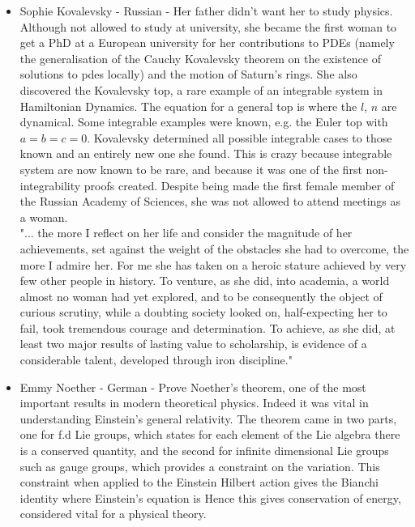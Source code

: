 \documentclass{article}
\begin{document}
\begin{itemize}
    
    \item Sophie Kovalevsky - Russian - Her father didn't want her to study physics. Although not allowed to study at university, she became the first woman to get a PhD at a European university for her contributions to PDEs (namely the generalisation of the Cauchy Kovalevsky theorem on the existence of solutions to pdes locally) and the motion of Saturn's rings. She also discovered the Kovalevsky top, a rare example of an integrable system in Hamiltonian Dynamics. The equation for a general top is 
    where the $l$, $n$ are dynamical. Some integrable examples were known, e.g. the Euler top with $a=b=c=0$. Kovalevsky determined all possible integrable cases to those known and an entirely new one she found. This is crazy because integrable system are now known to be rare, and because it was one of the first non-integrability proofs created. 
    Despite being made the first female member of the Russian Academy of Sciences, she was not allowed to attend meetings as a woman.  \\
    \newline
    "... the more I reflect on her life and consider the magnitude of her achievements, set against the weight of the obstacles she had to overcome, the more I admire her. For me she has taken on a heroic stature achieved by very few other people in history. To venture, as she did, into academia, a world almost no woman had yet explored, and to be consequently the object of curious scrutiny, while a doubting society looked on, half-expecting her to fail, took tremendous courage and determination. To achieve, as she did, at least two major results of lasting value to scholarship, is evidence of a considerable talent, developed through iron discipline."
    \newline
    
    
    \item Emmy Noether - German - Prove Noether's theorem, one of the most important results in modern theoretical physics. Indeed it was vital in understanding Einstein's general relativity. The theorem came in two parts, one for f.d Lie groups, which states for each element of the Lie algebra there is a conserved quantity, and the second for infinite dimensional Lie groups such as gauge groups, which provides a constraint on the variation. This constraint when applied to the Einstein Hilbert action gives the Bianchi identity 
    where Einstein's equation is 
    Hence this gives conservation of energy, considered vital for a physical theory.
    

\end{itemize}
\end{document}
